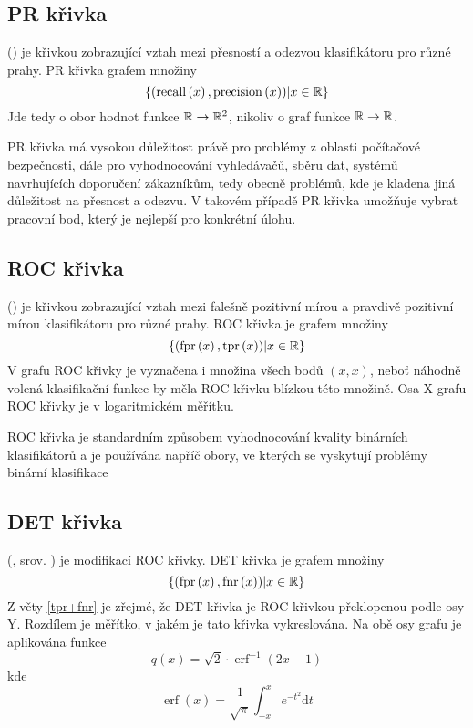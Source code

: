 \subsection{PR křivka}
 () je křivkou zobrazující vztah mezi přesností a odezvou klasifikátoru pro různé prahy. PR křivka grafem množiny
\[ \left\{ \left( \operatorname{recall} \left( x \right), \operatorname{precision} \left( x \right) \right) \middle| x \in \mathbb R \right\} \]
Jde tedy o obor hodnot funkce \( \mathbb R \to \mathbb R^2 \), nikoliv o graf funkce \( \mathbb R \to \mathbb R \).

PR křivka má vysokou důležitost právě pro problémy z oblasti počítačové bezpečnosti, dále pro vyhodnocování vyhledávačů, sběru dat, systémů navrhujících doporučení zákazníkům, tedy obecně problémů, kde je kladena jiná důležitost na přesnost a odezvu. V takovém případě PR křivka umožňuje vybrat pracovní bod, který je nejlepší pro konkrétní úlohu.

\subsection{ROC křivka}
 () je křivkou zobrazující vztah mezi falešně pozitivní mírou a pravdivě pozitivní mírou klasifikátoru pro různé prahy. ROC křivka je grafem množiny
\[ \left\{ \left( \operatorname{fpr} \left( x \right), \operatorname{tpr} \left( x \right) \right) \middle| x \in \mathbb R \right\} \]
V grafu ROC křivky je vyznačena i množina všech bodů \( \left( x, x \right) \), neboť náhodně volená klasifikační funkce by měla ROC křivku blízkou této množině. Osa X grafu ROC křivky je v logaritmickém měřítku.

ROC křivka je standardním způsobem vyhodnocování kvality binárních klasifikátorů a je používána napříč obory, ve kterých se vyskytují problémy binární klasifikace

\subsection{DET křivka}
 (, srov. \cite{martin_det_1997}) je modifikací ROC křivky. DET křivka je grafem množiny
\[ \left\{ \left( \operatorname{fpr} \left( x \right), \operatorname{fnr} \left( x \right) \right) \middle| x \in \mathbb R \right\} \]
Z věty \ref{tpr+fnr} je zřejmé, že DET křivka je ROC křivkou překlopenou podle osy Y. Rozdílem je měřítko, v jakém je tato křivka vykreslována. Na obě osy grafu je aplikována funkce
\[ q \left( x \right) = \sqrt{2} \cdot \operatorname{erf}^{-1} \left( 2x - 1 \right) \]
kde
\[ \operatorname{erf} \left( x \right) = \frac{1}{\sqrt{\pi}} \int_{-x}^{x} e^{-t^2} \mathrm{d} t \]


